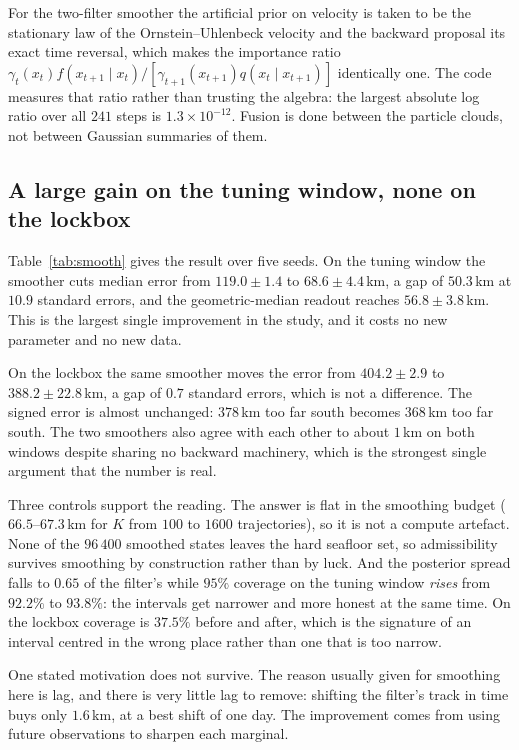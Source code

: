 \documentclass[conference]{IEEEtran}
\begin{document}
For the two-filter smoother the artificial prior on velocity is taken to be the
stationary law of the Ornstein--Uhlenbeck velocity and the backward proposal its
exact time reversal, which makes the importance ratio
$\gamma_t(x_t)f(x_{t+1}\mid x_t)/[\gamma_{t+1}(x_{t+1})q(x_t\mid x_{t+1})]$
identically one. The code measures that ratio rather than trusting the algebra:
the largest absolute log ratio over all $241$ steps is $1.3\times10^{-12}$.
Fusion is done between the particle clouds, not between Gaussian summaries of
them.

\subsection{A large gain on the tuning window, none on the lockbox}

Table~\ref{tab:smooth} gives the result over five seeds. On the tuning window
the smoother cuts median error from $119.0\pm1.4$ to $68.6\pm4.4$\,\si{\km}, a
gap of $50.3$\,\si{\km} at $10.9$ standard errors, and the geometric-median
readout reaches $56.8\pm3.8$\,\si{\km}. This is the largest single improvement
in the study, and it costs no new parameter and no new data.

On the lockbox the same smoother moves the error from $404.2\pm2.9$ to
$388.2\pm22.8$\,\si{\km}, a gap of $0.7$ standard errors, which is not a
difference. The signed error is almost unchanged: $378$\,\si{\km} too far south
becomes $368$\,\si{\km} too far south. The two smoothers also agree with each
other to about $1$\,\si{\km} on both windows despite sharing no backward
machinery, which is the strongest single argument that the number is real.

Three controls support the reading. The answer is flat in the smoothing budget
($66.5$--$67.3$\,\si{\km} for $K$ from $100$ to $1600$ trajectories), so it is
not a compute artefact. None of the $96\,400$ smoothed states leaves the hard
seafloor set, so admissibility survives smoothing by construction rather than by
luck. And the posterior spread falls to $0.65$ of the filter's while $95\%$
coverage on the tuning window \emph{rises} from $92.2\%$ to $93.8\%$: the
intervals get narrower and more honest at the same time. On the lockbox coverage
is $37.5\%$ before and after, which is the signature of an interval centred in
the wrong place rather than one that is too narrow.

One stated motivation does not survive. The reason usually given for smoothing
here is lag, and there is very little lag to remove: shifting the filter's track
in time buys only $1.6$\,\si{\km}, at a best shift of one day. The improvement
comes from using future observations to sharpen each marginal.
\end{document}
